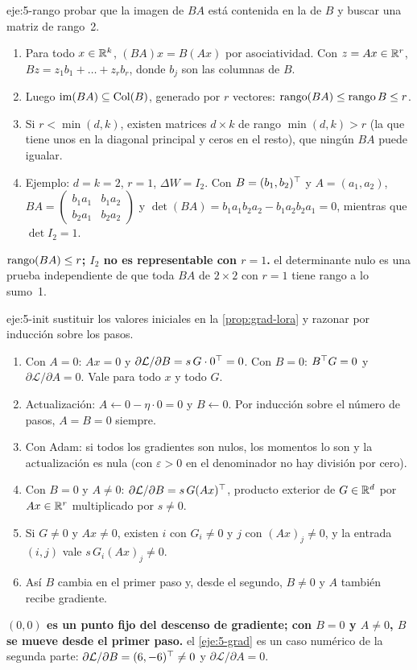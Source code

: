\begin{solucion}{eje:5-rango}
\planteamiento probar que la imagen de $BA$ está contenida en la de $B$ y buscar una matriz de rango~2.
\pasos
\begin{enumerate}[label=\arabic*.]
  \item Para todo $x\in\mathbb{R}^{k}$, $(BA)x=B(Ax)$ por asociatividad. Con $z=Ax\in\mathbb{R}^{r}$, $Bz=z_1b_1+\dots+z_rb_r$, donde $b_j$ son las columnas de $B$.
  \item Luego $\operatorname{im}(BA)\subseteq\operatorname{Col}(B)$, generado por $r$ vectores: $\operatorname{rango}(BA)\le\operatorname{rango} B\le r$.
  \item Si $r<\min(d,k)$, existen matrices $d\times k$ de rango $\min(d,k)>r$ (la que tiene unos en la diagonal principal y ceros en el resto), que ningún $BA$ puede igualar.
  \item Ejemplo: $d=k=2$, $r=1$, $\Delta W=I_2$. Con $B=(b_1,b_2)^{\top}$ y $A=(a_1,a_2)$, $BA=\begin{pmatrix}b_1a_1&b_1a_2\\b_2a_1&b_2a_2\end{pmatrix}$ y $\det(BA)=b_1a_1b_2a_2-b_1a_2b_2a_1=0$, mientras que $\det I_2=1$.
\end{enumerate}
\resultado \textbf{$\operatorname{rango}(BA)\le r$; $I_2$ no es representable con $r=1$.}
\comprobacion el determinante nulo es una prueba independiente de que toda $BA$ de $2\times 2$ con $r=1$ tiene rango a lo sumo~1.
\end{solucion}

\begin{solucion}{eje:5-init}
\planteamiento sustituir los valores iniciales en la \cref{prop:grad-lora} y razonar por inducción sobre los pasos.
\pasos
\begin{enumerate}[label=\arabic*.]
  \item Con $A=0$: $Ax=0$ y $\partial\mathcal{L}/\partial B=s\,G\cdot 0^{\top}=0$. Con $B=0$: $B^{\top} G=0$ y $\partial\mathcal{L}/\partial A=0$. Vale para todo $x$ y todo $G$.
  \item Actualización: $A\gets 0-\eta\cdot 0=0$ y $B\gets 0$. Por inducción sobre el número de pasos, $A=B=0$ siempre.
  \item Con Adam: si todos los gradientes son nulos, los momentos lo son y la actualización es nula (con $\varepsilon>0$ en el denominador no hay división por cero).
  \item Con $B=0$ y $A\ne 0$: $\partial\mathcal{L}/\partial B=s\,G(Ax)^{\top}$, producto exterior de $G\in\mathbb{R}^{d}$ por $Ax\in\mathbb{R}^{r}$ multiplicado por $s\ne 0$.
  \item Si $G\ne 0$ y $Ax\ne 0$, existen $i$ con $G_i\ne 0$ y $j$ con $(Ax)_j\ne 0$, y la entrada $(i,j)$ vale $s\,G_i(Ax)_j\ne 0$.
  \item Así $B$ cambia en el primer paso y, desde el segundo, $B\ne 0$ y $A$ también recibe gradiente.
\end{enumerate}
\resultado \textbf{$(0,0)$ es un punto fijo del descenso de gradiente; con $B=0$ y $A\ne 0$, $B$ se mueve desde el primer paso.}
\comprobacion el \cref{eje:5-grad} es un caso numérico de la segunda parte: $\partial\mathcal{L}/\partial B=(6,-6)^{\top}\ne 0$ y $\partial\mathcal{L}/\partial A=0$.
\end{solucion}

